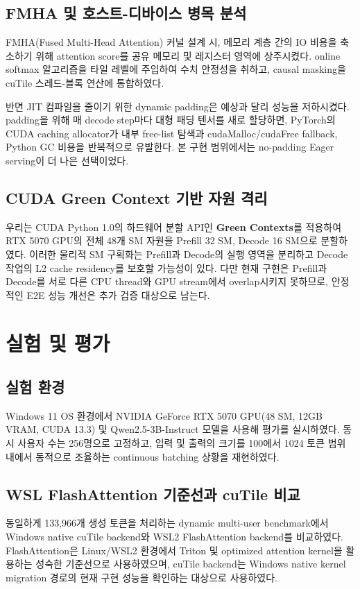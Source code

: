 \documentclass{kcc}            %
\begin{document}
\subsection{FMHA 및 호스트-디바이스 병목 분석}
FMHA(Fused Multi-Head Attention) 커널 설계 시, 메모리 계층 간의 IO 비용을
축소하기 위해 attention score를 공유 메모리 및 레지스터 영역에 상주시켰다.
online softmax 알고리즘을 타일 레벨에 주입하여 수치 안정성을 취하고,
causal masking을 cuTile 스레드-블록 연산에 통합하였다.

반면 JIT 컴파일을 줄이기 위한 dynamic padding은 예상과 달리 성능을
저하시켰다. padding을 위해 매 decode step마다 대형 패딩 텐서를 새로
할당하면, PyTorch의 CUDA caching allocator가 내부 free-list 탐색과
cudaMalloc/cudaFree fallback, Python GC 비용을 반복적으로 유발한다. 본
구현 범위에서는 no-padding Eager serving이 더 나은 선택이었다.

\subsection{CUDA Green Context 기반 자원 격리}
우리는 CUDA Python 1.0의 하드웨어 분할 API인 \textbf{Green Contexts}를
적용하여 RTX 5070 GPU의 전체 48개 SM 자원을 Prefill 32 SM, Decode 16 SM으로
분할하였다. 이러한 물리적 SM 구획화는 Prefill과 Decode의 실행 영역을
분리하고 Decode 작업의 L2 cache residency를 보호할 가능성이 있다. 다만
현재 구현은 Prefill과 Decode를 서로 다른 CPU thread와 GPU stream에서
overlap시키지 못하므로, 안정적인 E2E 성능 개선은 추가 검증 대상으로 남는다.

\section{실험 및 평가}
\subsection{실험 환경}
Windows 11 OS 환경에서 NVIDIA GeForce RTX 5070 GPU(48 SM, 12GB VRAM,
CUDA 13.3) 및 Qwen2.5-3B-Instruct 모델을 사용해 평가를 실시하였다. 동시
사용자 수는 256명으로 고정하고, 입력 및 출력의 크기를 100에서 1024 토큰
범위 내에서 동적으로 조율하는 continuous batching 상황을 재현하였다.

\subsection{WSL FlashAttention 기준선과 cuTile 비교}
동일하게 133,966개 생성 토큰을 처리하는 dynamic multi-user benchmark에서
Windows native cuTile backend와 WSL2 FlashAttention backend를 비교하였다.
FlashAttention은 Linux/WSL2 환경에서 Triton 및 optimized attention kernel을
활용하는 성숙한 기준선으로 사용하였으며, cuTile backend는 Windows native
kernel migration 경로의 현재 구현 성능을 확인하는 대상으로 사용하였다.
\end{document}

